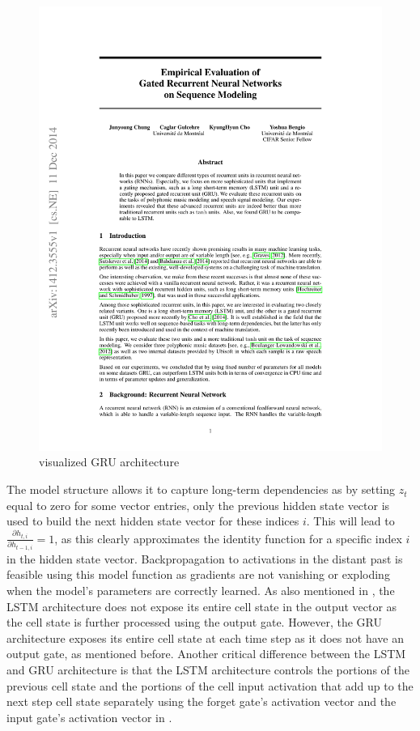 \documentclass[draft,final]{vutinfth} %
\begin{document}
    \begin{figure}[H]
        \centering{}
        \includegraphics[page=3,width=0.8\linewidth,trim={300 590 125 80},clip]{literature/empirical_evaluation_of_gated_recurrent_neural_networks_on_sequence_modeling.pdf}
        \caption{visualized GRU architecture \cite[p. 3]{GRU}}
        \label{fig:gru_vis}
    \end{figure}
    The model structure allows it to capture long-term dependencies as by setting $z_t$ equal to zero for some vector entries, only the previous hidden state vector is used to build the next hidden state vector for these indices $i$.
    This will lead to $\frac{\partial{h_{t,i}}}{\partial{h_{t-1,i}}} = 1$, as this clearly approximates the identity function for a specific index $i$ in the hidden state vector.
    Backpropagation to activations in the distant past is feasible using this model function as gradients are not vanishing or exploding when the model's parameters are correctly learned.
    As also mentioned in \cite[p. 5]{GRU}, the LSTM architecture does not expose its entire cell state in the output vector as the cell state is further processed using the output gate.
    However, the GRU architecture exposes its entire cell state at each time step as it does not have an output gate, as mentioned before.
    Another critical difference between the LSTM and GRU architecture is that the LSTM architecture controls the portions of the previous cell state and the portions of the cell input activation that add up to the next step cell state separately using the forget gate's activation vector and the input gate's activation vector in .
\end{document}
